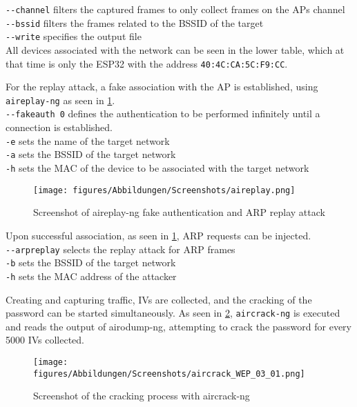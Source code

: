 \lstinline[]|--channel| filters the captured frames to only collect frames on the APs channel 
\\\lstinline[]|--bssid| filters the frames related to the BSSID of the target 
\\\lstinline[]|--write| specifies the output file
\\All devices associated with the network can be seen in the lower table, which at that time is only the ESP32 with the address \lstinline[]|40:4C:CA:5C:F9:CC|.

For the replay attack, a fake association with the AP is established, using \lstinline[]|aireplay-ng| as seen in \cref{fig:aireplay-ng}. 
\\\lstinline[]|--fakeauth 0| defines the authentication to be performed infinitely until a connection is established. 
\\\lstinline[]|-e| sets the name of the target network
\\\lstinline[]|-a| sets the BSSID of the target network
\\\lstinline[]|-h| sets the MAC of the device to be associated with the target network

\begin{figure}[h]
    \centering
    \texttt{[image: figures/Abbildungen/Screenshots/aireplay.png]}
    \caption{Screenshot of aireplay-ng fake authentication and ARP replay attack}
    \label{fig:aireplay-ng}
\end{figure}

Upon successful association, as seen in \cref{fig:aireplay-ng}, ARP requests can be injected.
\\\lstinline[]|--arpreplay| selects the replay attack for ARP frames
\\\lstinline[]|-b| sets the BSSID of the target network
\\\lstinline[]|-h| sets the MAC address of the attacker

Creating and capturing traffic, IVs are collected, and the cracking of the password can be started simultaneously. 
As seen in \cref{fig:aircrack-ng_WEP_process}, \lstinline[]|aircrack-ng| is executed and reads the output of airodump-ng, attempting to crack the password for every 5000 IVs collected.

\begin{figure}[h]
    \centering
    \texttt{[image: figures/Abbildungen/Screenshots/aircrack\_WEP\_03\_01.png]}
    \caption{Screenshot of the cracking process with aircrack-ng}
    \label{fig:aircrack-ng_WEP_process}
\end{figure}

